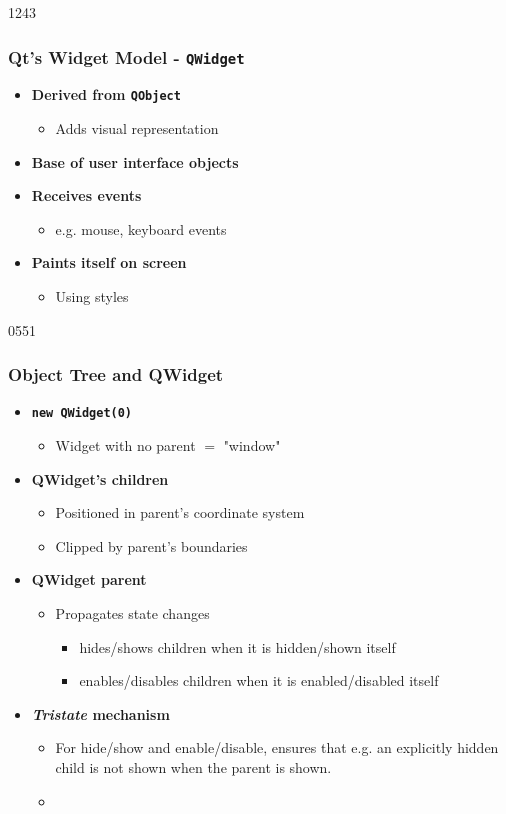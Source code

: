 \begin{slide}{1243}
  \frametitle{Qt's Widget Model - \texttt{QWidget}}
  \begin{itemize}
 \item \textbf{Derived from \texttt{QObject}}
    \begin{itemize}
    \item Adds visual representation
    \end{itemize}
  \item \textbf{Base of user interface objects}
  \item \textbf{Receives events}
    \begin{itemize}
    \item e.g. mouse, keyboard events
    \end{itemize}
  \item \textbf{Paints itself on screen}
    \begin{itemize}
    \item Using styles
    \end{itemize}

\end{itemize}
\end{slide}

\begin{slide}[fragile]{0551}\frametitle{Object Tree and QWidget}
  \begin{itemize}
  \item \textbf{\texttt{new QWidget(0)}}
    \begin{itemize}
    \item Widget with no parent $=$ "window"
    \end{itemize}
  \item \textbf{QWidget's children}
    \begin{itemize}
    \item Positioned in parent's coordinate system
    \item Clipped by parent's boundaries
    \end{itemize}
  \item \textbf{QWidget parent }
    \begin{itemize}
    \item Propagates state changes
      \begin{itemize}
      \item hides/shows children when it is hidden/shown itself
      \item enables/disables children when it is enabled/disabled itself
      \end{itemize}
    \end{itemize}
  \item \textbf{\textit{Tristate} mechanism}
    \begin{itemize}
      \item For hide/show and enable/disable, ensures that e.g. an
        explicitly hidden child is not shown when the parent is shown.
      \item {}
      \end{itemize}
 \end{itemize}
\end{slide}


